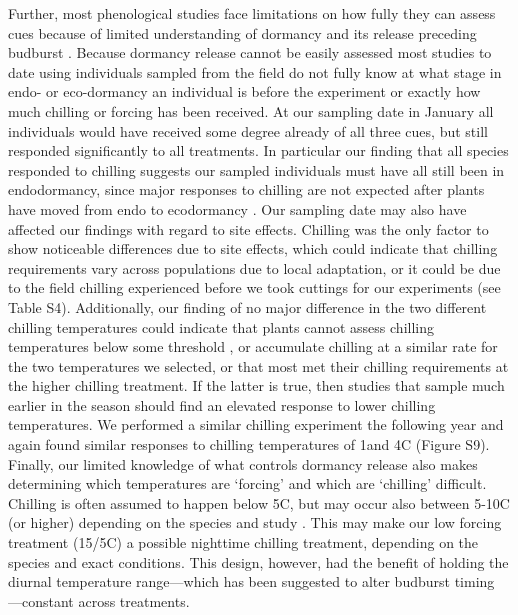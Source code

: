 \documentclass[11pt]{article}
\begin{document}
Further, most phenological studies face limitations on how fully they can assess cues because of limited understanding of dormancy and its release preceding budburst \citep{Cooke2012,chuine2016}. Because dormancy release cannot be easily assessed \citep{chuine2016} most studies to date using individuals sampled from the field do not fully know at what stage in endo- or eco-dormancy an individual is before the experiment or exactly how much chilling or forcing has been received. At our sampling date in January all individuals would have received some degree already of all three cues, but still responded significantly to all treatments. In particular our finding that all species responded to chilling suggests our sampled individuals must have all still been in endodormancy, since major responses to chilling are not expected after plants have moved from endo to ecodormancy \citep{chuine2016}. Our sampling date may also have affected our findings with regard to site effects. Chilling was the only factor to show noticeable differences due to site effects, which could indicate that chilling requirements vary across populations due to local adaptation, or it could be due to the field chilling experienced before we took cuttings for our experiments (see Table S4). Additionally, our finding of no major difference in the two different chilling temperatures could indicate that plants cannot assess chilling temperatures below some threshold \citep{coville1920,Harrington:2010,guy2014}, or accumulate chilling at a similar rate for the two temperatures we selected, or that most met their chilling requirements at the higher chilling treatment. If the latter is true, then studies that sample much earlier in the season should find an elevated response to lower chilling temperatures. We performed a similar chilling experiment the following year and again found similar responses to chilling temperatures of 1\degree and 4\degree C (Figure S9). Finally, our limited knowledge of what controls dormancy release also makes determining which temperatures are `forcing' and which are `chilling' difficult. Chilling is often assumed to happen below 5\degree C, but may occur also between 5-10\degree C (or higher) depending on the species and study \citep{Luedeling2013AgFM,harrington2015}. This may make our low forcing treatment (15/5\degree C) a possible nighttime chilling treatment, depending on the species and exact conditions. This design, however, had the benefit of holding the diurnal temperature range---which has been suggested to alter budburst timing \citep{rossi2017}---constant across treatments. \\ %
\end{document}
